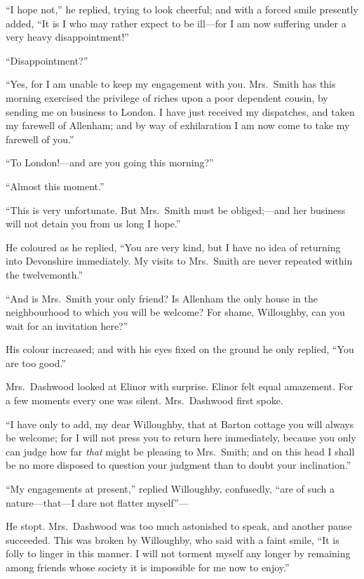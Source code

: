 \documentclass{article}
\begin{document}
``I hope not,'' he replied, trying to look cheerful;
and with a forced smile presently added, ``It is I who may
rather expect to be ill---for I am now suffering under a
very heavy disappointment!''

``Disappointment?''

``Yes, for I am unable to keep my engagement with you.
Mrs.\ Smith has this morning exercised the privilege
of riches upon a poor dependent cousin, by sending me on
business to London.  I have just received my dispatches,
and taken my farewell of Allenham; and by way of exhilaration
I am now come to take my farewell of you.''

``To London!---and are you going this morning?''

``Almost this moment.''

``This is very unfortunate.  But Mrs.\ Smith must
be obliged;---and her business will not detain you from
us long I hope.''

He coloured as he replied, ``You are very kind, but I
have no idea of returning into Devonshire immediately.
My visits to Mrs.\ Smith are never repeated within
the twelvemonth.''

``And is Mrs.\ Smith your only friend?  Is Allenham the only
house in the neighbourhood to which you will be welcome?
For shame, Willoughby, can you wait for an invitation here?''

His colour increased; and with his eyes fixed
on the ground he only replied, ``You are too good.''

Mrs.\ Dashwood looked at Elinor with surprise.
Elinor felt equal amazement.  For a few moments every one
was silent.  Mrs.\ Dashwood first spoke.

``I have only to add, my dear Willoughby, that at
Barton cottage you will always be welcome; for I will not
press you to return here immediately, because you only
can judge how far \emph{that} might be pleasing to Mrs.\ Smith;
and on this head I shall be no more disposed to question
your judgment than to doubt your inclination.''

``My engagements at present,'' replied Willoughby,
confusedly, ``are of such a nature---that---I dare not flatter
myself''---%

He stopt.  Mrs.\ Dashwood was too much astonished
to speak, and another pause succeeded.  This was broken
by Willoughby, who said with a faint smile, ``It is folly
to linger in this manner.  I will not torment myself
any longer by remaining among friends whose society
it is impossible for me now to enjoy.''
\end{document}
